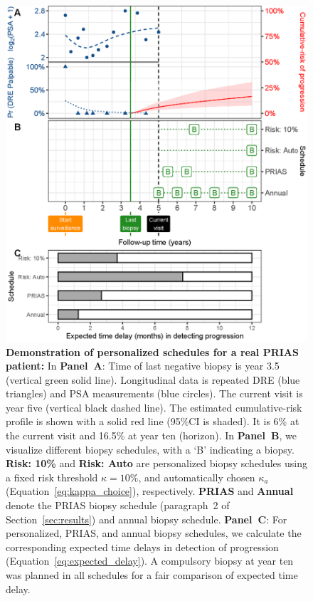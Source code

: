\begin{figure}
\centerline{\includegraphics{images/demo_schedule.eps}}
\caption{\textbf{Demonstration of personalized schedules for a real PRIAS patient:} In \textbf{Panel~A}: Time of last negative biopsy is year 3.5 (vertical green solid line). Longitudinal data is repeated DRE (blue triangles) and PSA measurements (blue circles). The current visit is year five (vertical black dashed line). The estimated cumulative-risk profile is shown with a solid red line (95\%CI is shaded). It is 6\% at the current visit and 16.5\% at year ten (horizon). In \textbf{Panel~B}, we visualize different biopsy schedules, with a `B' indicating a biopsy. \textbf{Risk: 10\%} and \textbf{Risk: Auto} are personalized biopsy schedules using a fixed risk threshold $\kappa=10\%$, and automatically chosen $\kappa_a$ (Equation~\ref{eq:kappa_choice}), respectively. \textbf{PRIAS} and \textbf{Annual} denote the PRIAS biopsy schedule (paragraph~2 of Section~\ref{sec:results}) and annual biopsy schedule. \textbf{Panel~C}: For personalized, PRIAS, and annual biopsy schedules, we calculate the corresponding expected time delays in detection of progression (Equation~\ref{eq:expected_delay}). A compulsory biopsy at year ten was planned in all schedules for a fair comparison of expected time delay.} 
\label{fig:demo_schedule}
\end{figure}
